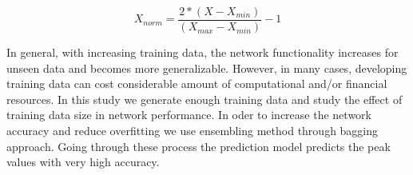 \begin{equation}
X_{norm} = \frac{2*(X-X_{min})}{(X_{max}-X_{min})}-1
\end{equation}

In general, with increasing training data, the network functionality increases for unseen data and becomes more generalizable. However, in many cases, developing training data can cost considerable amount of computational and/or financial resources. In this study we generate enough training data and study the effect of training data size in network performance. In oder to increase the network accuracy and reduce overfitting we use ensembling method through bagging approach. Going through these process the prediction model predicts the peak values with very high accuracy. 
